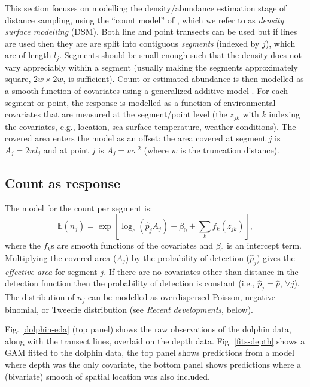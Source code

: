 \documentclass[a4paper,12pt]{article}
\begin{document}
This section focuses on modelling the density/abundance estimation stage of distance sampling, using the ``count model'' of \cite{Hedley:2004et}, which we refer to as \textit{density surface modelling} (DSM). Both line and point transects can be used but if lines are used then they are are split into contiguous \textit{segments} (indexed by $j$), which are of length $l_j$. Segments should be small enough such that the density does not vary appreciably within a segment (usually making the segments approximately square, $2w\times 2w$, is sufficient). Count or estimated abundance is then modelled as a smooth function of covariates using a generalized additive model \cite[GAM; e.g.][]{Wood:2006wz}. For each segment or point, the response is modelled as a function of environmental covariates that are measured at the segment/point level (the $z_{jk}$ with $k$ indexing the covariates, e.g., location, sea surface temperature, weather conditions). The covered area enters the model as an offset: the area covered at segment $j$ is $A_j = 2wl_j$ and at point $j$ is $A_j=w\pi^2$ (where $w$ is the truncation distance). 

\subsection*{Count as response}

The model for the count per segment is:
\begin{equation*}
\mathbb{E}(n_j) = \exp\left[ \log_e \left( \hat{p}_j A_j \right) + \beta_0 + \sum_k f_k\left(z_{jk}\right) \right],
\end{equation*}
where the $f_k$s are smooth functions of the covariates and $\beta_0$ is an intercept term. Multiplying the covered area ($A_j$) by the probability of detection ($\hat{p}_j$) gives the \textit{effective area} for segment $j$. If there are no covariates other than distance in the detection function then the probability of detection is constant (i.e., $\hat{p}_j=\hat{p}$, $\forall j$). The distribution of $n_j$ can be modelled as overdispersed Poisson, negative binomial, or Tweedie distribution (see \textit{Recent developments}, below).

Fig. \ref{dolphin-eda} (top panel) shows the raw observations of the dolphin data, along with the transect lines, overlaid on the depth data. Fig. \ref{fits-depth} shows a GAM fitted to the dolphin data, the top panel shows predictions from a model where depth was the only covariate, the bottom panel shows predictions where a (bivariate) smooth of spatial location was also included. 
\end{document}
